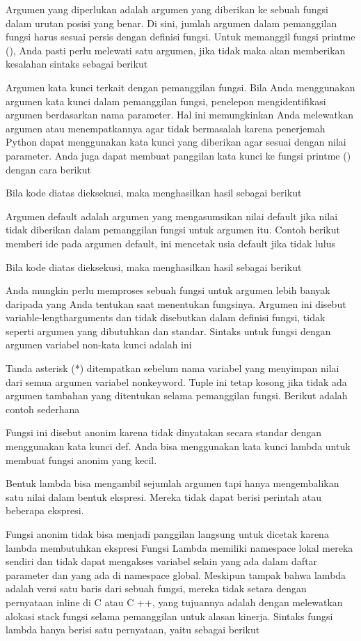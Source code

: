 Argumen yang diperlukan adalah argumen yang diberikan ke sebuah fungsi dalam urutan posisi yang benar. Di sini, jumlah argumen dalam pemanggilan fungsi harus sesuai persis dengan definisi fungsi. Untuk memanggil fungsi printme (), Anda pasti perlu melewati satu argumen, jika tidak maka akan memberikan kesalahan sintaks sebagai berikut 

Argumen kata kunci terkait dengan pemanggilan fungsi. Bila Anda menggunakan argumen kata kunci dalam pemanggilan fungsi, penelepon mengidentifikasi argumen berdasarkan nama parameter. Hal ini memungkinkan Anda melewatkan argumen atau menempatkannya agar tidak bermasalah karena penerjemah Python dapat menggunakan kata kunci yang diberikan agar sesuai dengan nilai parameter. Anda juga dapat membuat panggilan kata kunci ke fungsi printme () dengan cara berikut 

Bila kode diatas dieksekusi, maka menghasilkan hasil sebagai berikut 

Argumen default adalah argumen yang mengasumsikan nilai default jika nilai tidak diberikan dalam pemanggilan fungsi untuk argumen itu. Contoh berikut memberi ide pada argumen default, ini mencetak usia default jika tidak lulus

Bila kode diatas dieksekusi, maka menghasilkan hasil sebagai berikut 

Anda mungkin perlu memproses sebuah fungsi untuk argumen lebih banyak daripada yang Anda tentukan saat menentukan fungsinya. Argumen ini disebut variable-lengtharguments dan tidak disebutkan dalam definisi fungsi, tidak seperti argumen yang dibutuhkan dan standar. 
Sintaks untuk fungsi dengan argumen variabel non-kata kunci adalah ini 

Tanda asterisk (*) ditempatkan sebelum nama variabel yang menyimpan nilai dari semua argumen variabel nonkeyword. Tuple ini tetap kosong jika tidak ada argumen tambahan yang ditentukan selama pemanggilan fungsi. Berikut adalah contoh sederhana

Fungsi ini disebut anonim karena tidak dinyatakan secara standar dengan menggunakan kata kunci def. Anda bisa menggunakan kata kunci lambda untuk membuat fungsi anonim yang kecil. \par

Bentuk lambda bisa mengambil sejumlah argumen tapi hanya mengembalikan satu nilai dalam bentuk ekspresi. Mereka tidak dapat berisi perintah atau beberapa ekspresi. \par
Fungsi anonim tidak bisa menjadi panggilan langsung untuk dicetak karena lambda  membutuhkan ekspresi Fungsi Lambda memiliki namespace lokal mereka sendiri dan tidak dapat mengakses variabel selain yang ada dalam daftar parameter dan yang ada di namespace global. 
Meskipun tampak bahwa lambda adalah versi satu baris dari sebuah fungsi, mereka tidak setara dengan pernyataan inline di C atau C ++, yang tujuannya adalah dengan  melewatkan alokasi stack fungsi selama pemanggilan untuk alasan kinerja. 
Sintaks fungsi lambda hanya berisi satu pernyataan, yaitu sebagai berikut 

